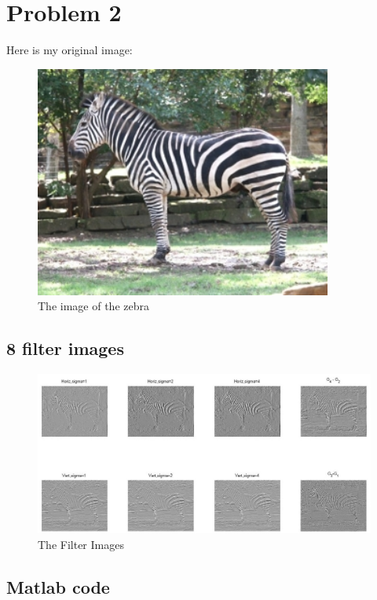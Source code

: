 \documentclass[11pt,psfig]{article}
\begin{document}
\newpage

\section*{Problem 2}

Here is my original image:

\begin{figure}[H]
\centering
\includegraphics[height=3in]{zebra_small.jpg}
\caption{The image of the zebra}
\end{figure}

\subsection*{8 filter images}

\begin{figure}[H]
\centering
\includegraphics[width=7in]{prob2filterImages.jpg}
\caption{The Filter Images}
\end{figure}

\subsection*{Matlab code}
\end{document}
